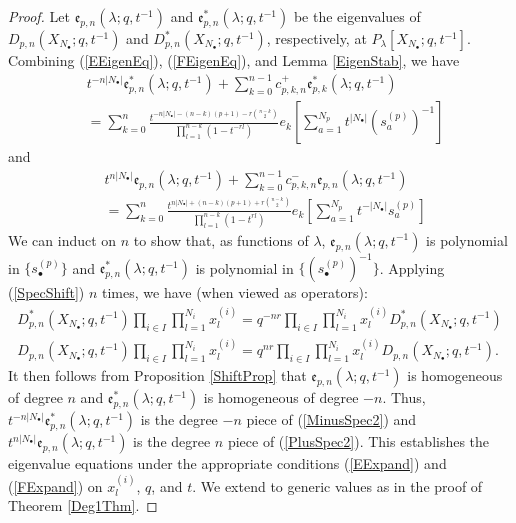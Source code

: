 \documentclass{amsart}
\theoremstyle{remark}
\numberwithin{thm}{section}
\numberwithin{equation}{section}
\begin{document}
\begin{proof}
Let $\mathfrak{e}_{p,n}(\lambda;q,t^{-1})$ and $\mathfrak{e}_{p,n}^*(\lambda;q,t^{-1})$ be the eigenvalues of $D_{p,n}(X_{N_\bullet};q,t^{-1})$ and $D_{p,n}^*(X_{N_\bullet};q,t^{-1})$, respectively, at $P_\lambda[X_{N_\bullet};q,t^{-1}]$.
Combining (\ref{EEigenEq}), (\ref{FEigenEq}), and Lemma \ref{EigenStab}, we have
\begin{align}
\nonumber
    &t^{-n|N_\bullet|}\mathfrak{e}_{p,n}^*(\lambda;q,t^{-1})+\sum_{k=0}^{n-1}c_{p,k,n}^+ \mathfrak{e}_{p,k}^*(\lambda;q,t^{-1})\\
\label{MinusSpec2}
    &=\sum_{k=0}^n\frac{t^{-n|N_\bullet|-(n-k)(p+1)-r\binom{n-k}{2}}}{\displaystyle\prod_{l=1}^{n-k}(1-t^{-rl})}e_k\left[ \sum_{a=1}^{N_p}t^{|N_\bullet|}\left(s^{(p)}_{a}\right)^{-1} \right]
\end{align}
and
\begin{align}
\nonumber
    &t^{n|N_\bullet|}\mathfrak{e}_{p,n}(\lambda;q,t^{-1}) +\sum_{k=0}^{n-1}c_{p,k,n}^-\mathfrak{e}_{p,n}(\lambda;q,t^{-1})\\
\label{PlusSpec2}
    &=\sum_{k=0}^n\frac{t^{n|N_\bullet|+(n-k)(p+1)+r\binom{n-k}{2}}}{\displaystyle\prod_{l=1}^{n-k}(1-t^{rl})}e_k\left[ \sum_{a=1}^{N_p}t^{-|N_\bullet|}s^{(p)}_{a} \right]
\end{align}
We can induct on $n$ to show that, as functions of $\lambda$, $\mathfrak{e}_{p,n}(\lambda ;q,t^{-1})$ is polynomial in $\{ s_{\bullet}^{(p)} \}$ and $\mathfrak{e}_{p,n}^*(\lambda ;q,t^{-1})$ is polynomial in $\{ (s^{(p)}_{\bullet})^{-1} \}$.
Applying (\ref{SpecShift}) $n$ times, we have (when viewed as operators):
\begin{align*}
D_{p,n}^*(X_{N_\bullet};q,t^{-1})\prod_{i\in I}\prod_{l=1}^{N_i}x^{(i)}_{l}=q^{-nr}\prod_{i\in I}\prod_{l=1}^{N_i}x^{(i)}_{l}D_{p,n}^*(X_{N_\bullet};q,t^{-1})\\
D_{p,n}(X_{N_\bullet};q,t^{-1})\prod_{i\in I}\prod_{l=1}^{N_i}x^{(i)}_{l}=q^{nr}\prod_{i\in I}\prod_{l=1}^{N_i}x^{(i)}_{l}D_{p,n}(X_{N_\bullet};q,t^{-1}).
\end{align*}
It then follows from Proposition \ref{ShiftProp} that $\mathfrak{e}_{p,n}(\lambda ;q,t^{-1})$ is homogeneous of degree $n$ and $\mathfrak{e}_{p,n}^*(\lambda;q,t^{-1})$ is homogeneous of degree $-n$.
Thus, $t^{-n|N_\bullet|}\mathfrak{e}_{p,n}^*(\lambda;q,t^{-1})$ is the degree $-n$ piece of (\ref{MinusSpec2}) and $t^{n|N_\bullet|}\mathfrak{e}_{p,n}(\lambda ;q,t^{-1})$ is the degree $n$ piece of (\ref{PlusSpec2}).
This establishes the eigenvalue equations under the appropriate conditions (\ref{EExpand}) and (\ref{FExpand}) on $x^{(i)}_{l}$, $q$, and $t$.
We extend to generic values as in the proof of Theorem \ref{Deg1Thm}.
\end{proof}
\end{document}
